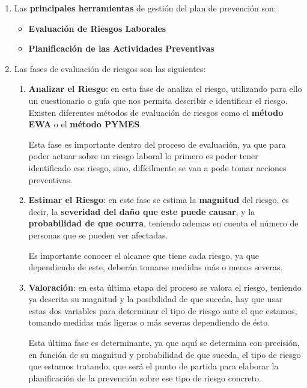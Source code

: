 \begin{enumerate}[label=\alph*.]
    \item Las \textbf{principales herramientas} de gestión del plan de prevención son:
    \begin{itemize}
        \item \textbf{Evaluación de Riesgos Laborales}
        \item \textbf{Planificación de las Actividades Preventivas}
    \end{itemize}

    \item Las fases de evaluación de riesgos son las siguientes:
    \begin{enumerate}
        \item \textbf{Analizar el Riesgo}: en esta fase de analiza el riesgo, utilizando para ello un cuestionario o guía que nos permita describir e identificar el riesgo. Existen diferentes métodos de evaluación de riesgos como el \textbf{método EWA} o el \textbf{método PYMES}.

        Esta fase es importante dentro del proceso de evaluación, ya que para poder actuar sobre un riesgo laboral lo primero es poder tener identificado ese riesgo, sino, difícilmente se van a pode tomar acciones preventivas.

        \item \textbf{Estimar el Riesgo}: en este fase se estima la \textbf{magnitud} del riesgo, es decir, la \textbf{severidad del daño que este puede causar}, y la \textbf{probabilidad de que ocurra}, teniendo ademas en cuenta el número de personas que se pueden ver afectadas.

        Es importante conocer el alcance que tiene cada riesgo, ya que dependiendo de este, deberán tomarse medidas más o menos severas.

        \item \textbf{Valoración}: en esta última etapa del proceso se valora el riesgo, teniendo ya descrita su magnitud y la posibilidad de que suceda, hay que usar estas dos variables para determinar el tipo de riesgo ante el que estamos, tomando medidas más ligeras o más severas dependiendo de ésto.

        Esta última fase es determinante, ya que aquí se determina con precisión, en función de su magnitud y probabilidad de que suceda, el tipo de riesgo que estamos tratando, que será el punto de partida para elaborar la planificación de la prevención sobre ese tipo de riesgo concreto.
    \end{enumerate}


\end{enumerate}
